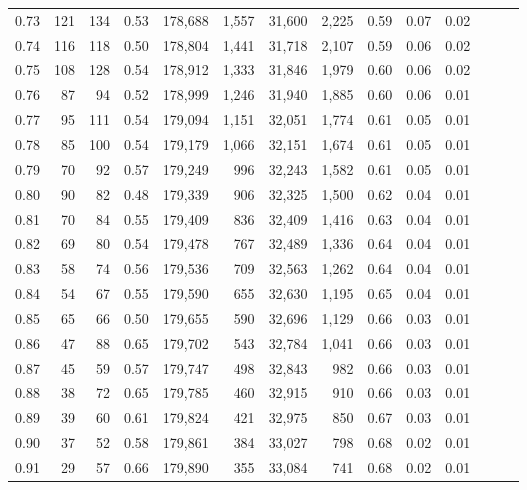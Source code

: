 \begin{tabular}{rrrrrrrrrrrrrr}
0.73 &    121 &  134 &  0.53 &  178,688 &    1,557 &  31,600 &   2,225 &  0.59 &  0.07 &      0.02 \\
0.74 &    116 &  118 &  0.50 &  178,804 &    1,441 &  31,718 &   2,107 &  0.59 &  0.06 &      0.02 \\
0.75 &    108 &  128 &  0.54 &  178,912 &    1,333 &  31,846 &   1,979 &  0.60 &  0.06 &      0.02 \\
0.76 &     87 &   94 &  0.52 &  178,999 &    1,246 &  31,940 &   1,885 &  0.60 &  0.06 &      0.01 \\
0.77 &     95 &  111 &  0.54 &  179,094 &    1,151 &  32,051 &   1,774 &  0.61 &  0.05 &      0.01 \\
0.78 &     85 &  100 &  0.54 &  179,179 &    1,066 &  32,151 &   1,674 &  0.61 &  0.05 &      0.01 \\
0.79 &     70 &   92 &  0.57 &  179,249 &      996 &  32,243 &   1,582 &  0.61 &  0.05 &      0.01 \\
0.80 &     90 &   82 &  0.48 &  179,339 &      906 &  32,325 &   1,500 &  0.62 &  0.04 &      0.01 \\
0.81 &     70 &   84 &  0.55 &  179,409 &      836 &  32,409 &   1,416 &  0.63 &  0.04 &      0.01 \\
0.82 &     69 &   80 &  0.54 &  179,478 &      767 &  32,489 &   1,336 &  0.64 &  0.04 &      0.01 \\
0.83 &     58 &   74 &  0.56 &  179,536 &      709 &  32,563 &   1,262 &  0.64 &  0.04 &      0.01 \\
0.84 &     54 &   67 &  0.55 &  179,590 &      655 &  32,630 &   1,195 &  0.65 &  0.04 &      0.01 \\
0.85 &     65 &   66 &  0.50 &  179,655 &      590 &  32,696 &   1,129 &  0.66 &  0.03 &      0.01 \\
0.86 &     47 &   88 &  0.65 &  179,702 &      543 &  32,784 &   1,041 &  0.66 &  0.03 &      0.01 \\
0.87 &     45 &   59 &  0.57 &  179,747 &      498 &  32,843 &     982 &  0.66 &  0.03 &      0.01 \\
0.88 &     38 &   72 &  0.65 &  179,785 &      460 &  32,915 &     910 &  0.66 &  0.03 &      0.01 \\
0.89 &     39 &   60 &  0.61 &  179,824 &      421 &  32,975 &     850 &  0.67 &  0.03 &      0.01 \\
0.90 &     37 &   52 &  0.58 &  179,861 &      384 &  33,027 &     798 &  0.68 &  0.02 &      0.01 \\
0.91 &     29 &   57 &  0.66 &  179,890 &      355 &  33,084 &     741 &  0.68 &  0.02 &      0.01 \\

\end{tabular}
